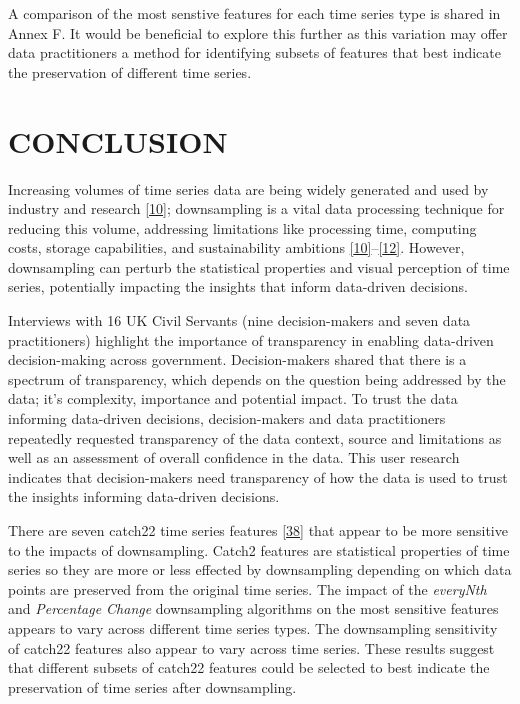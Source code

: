 \documentclass{article}
\begin{document}
A comparison of the most senstive features for each time series type is
shared in Annex F. It would be beneficial to explore this further as
this variation may offer data practitioners a method for identifying
subsets of features that best indicate the preservation of different
time series.

\hypertarget{conclusion}{%
\section{CONCLUSION}\label{conclusion}}

Increasing volumes of time series data are being widely generated and
used by industry and research \protect\hyperlink{ref-TVStore}{{[}10{]}};
downsampling is a vital data processing technique for reducing this
volume, addressing limitations like processing time, computing costs,
storage capabilities, and sustainability ambitions
\protect\hyperlink{ref-TVStore}{{[}10{]}}--\protect\hyperlink{ref-Shift}{{[}12{]}}.
However, downsampling can perturb the statistical properties and visual
perception of time series, potentially impacting the insights that
inform data-driven decisions.

Interviews with 16 UK Civil Servants (nine decision-makers and seven
data practitioners) highlight the importance of transparency in enabling
data-driven decision-making across government. Decision-makers shared
that there is a spectrum of transparency, which depends on the question
being addressed by the data; it's complexity, importance and potential
impact. To trust the data informing data-driven decisions,
decision-makers and data practitioners repeatedly requested transparency
of the data context, source and limitations as well as an assessment of
overall confidence in the data. This user research indicates that
decision-makers need transparency of how the data is used to trust the
insights informing data-driven decisions.

There are seven catch22 time series features
\protect\hyperlink{ref-catch22}{{[}38{]}} that appear to be more
sensitive to the impacts of downsampling. Catch2 features are
statistical properties of time series so they are more or less effected
by downsampling depending on which data points are preserved from the
original time series. The impact of the \emph{everyNth} and
\emph{Percentage Change} downsampling algorithms on the most sensitive
features appears to vary across different time series types. The
downsampling sensitivity of catch22 features also appear to vary across
time series. These results suggest that different subsets of catch22
features could be selected to best indicate the preservation of time
series after downsampling.
\end{document}
